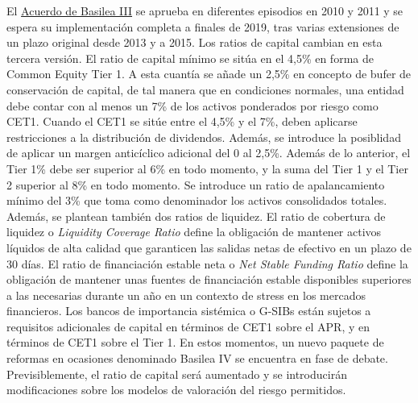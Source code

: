 \documentclass{nuevotema}
\begin{document}
El \underline{Acuerdo de Basilea III} se aprueba en diferentes episodios en 2010 y 2011 y se espera su implementación completa a finales de 2019, tras varias extensiones de un plazo original desde 2013 y a 2015. Los ratios de capital cambian en esta tercera versión. El ratio de capital mínimo se sitúa en el 4,5\% en forma de Common Equity Tier 1. A esta cuantía se añade un 2,5\% en concepto de bufer de conservación de capital, de tal manera que en condiciones normales, una entidad debe contar con al menos un 7\% de los activos ponderados por riesgo como CET1. Cuando el CET1 se sitúe entre el 4,5\% y el 7\%, deben aplicarse restricciones a la distribución de dividendos. Además, se introduce la posiblidad de aplicar un margen anticíclico adicional del 0 al 2,5\%. Además de lo anterior, el Tier 1\% debe ser superior al 6\% en todo momento, y la suma del Tier 1 y el Tier 2 superior al 8\% en todo momento. Se introduce un ratio de apalancamiento mínimo del 3\% que toma como denominador los activos consolidados totales. Además, se plantean también dos ratios de liquidez. El ratio de cobertura de liquidez o \textit{Liquidity Coverage Ratio} define la obligación de mantener activos líquidos de alta calidad que garanticen las salidas netas de efectivo en un plazo de 30 días. El ratio de financiación estable neta o \textit{Net Stable Funding Ratio} define la obligación de mantener unas fuentes de financiación estable disponibles superiores a las necesarias durante un año en un contexto de stress en los mercados financieros. Los bancos de importancia sistémica o G-SIBs están sujetos a requisitos adicionales de capital en términos de CET1 sobre el APR, y en términos de CET1 sobre el Tier 1. En estos momentos, un nuevo paquete de reformas en ocasiones denominado Basilea IV se encuentra en fase de debate. Previsiblemente, el ratio de capital será aumentado y se introducirán modificaciones sobre los modelos de valoración del riesgo permitidos.
\end{document}
